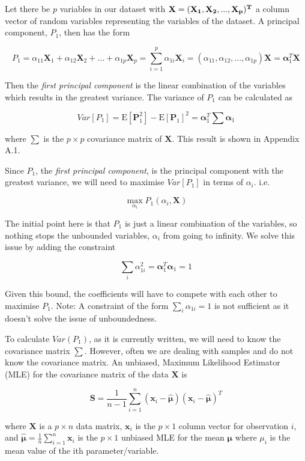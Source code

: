 \documentclass[11pt]{article}
\begin{document}
    Let there be \(p\) variables in our dataset with
\(\bf{X} = (\bf{X_1},\bf{X_2},...,\bf{X_p})^T\) a column vector of
random variables representing the variables of the dataset. A principal
component, \(P_1\), then has the form

\[P_1 = \alpha_{11} \textbf{X}_1 + \alpha_{12} \textbf{X}_2 + ... + \alpha_{1p} \textbf{X}_p = \sum_{i=1}^p \alpha_{1i} \textbf{X}_i = (\alpha_{11},\alpha_{12},...,\alpha_{1p})\textbf{X} = \boldsymbol{\alpha}_{1}^T \textbf{X}\]

Then the \emph{first principal component} is the linear combination of
the variables which results in the greatest variance. The variance of
\(P_1\) can be calculated as

\[Var[P_1] = \text{E}[\textbf{P}_1^2] - \text{E}[\textbf{P}_1]^2 = \boldsymbol{\alpha}_{1}^T \boldsymbol{\sum} \boldsymbol{\alpha}_{1}\]

where \(\boldsymbol{\sum}\) is the \(p \times p\) covariance matrix of
\(\textbf{X}\). This result is shown in Appendix A.1.

Since \(P_1\), the \emph{first principal component}, is the principal
component with the greatest variance, we will need to maximise
\(Var[P_1]\) in terms of \(\alpha_i\). i.e.

\[\max_{\alpha_i} P_1(\alpha_i,\boldsymbol{X})\]

The initial point here is that \(P_1\) is just a linear combination of
the variables, so nothing stops the unbounded variables, \(\alpha_i\)
from going to infinity. We solve this issue by adding the constraint

\[\sum_{i} \alpha_{1i}^2 = \boldsymbol{\alpha}_1^T \boldsymbol{\alpha}_1 =  1\]

Given this bound, the coefficients will have to compete with each other
to maximise \(P_1\). Note: A constraint of the form
\(\sum_{i} \alpha_{1i} = 1\) is not sufficient as it doesn't solve the
issue of unboundedness.

To calculate \(Var(P_1)\), as it is currently written, we will need to
know the covariance matrix \(\sum\). However, often we are dealing with
samples and do not know the covariance matrix. An unbiased, Maximum
Likelihood Estimator (MLE) for the covariance matrix of the data
\(\boldsymbol{X}\) is

\[\boldsymbol{S} = \frac{1}{n-1} \sum_{i=1}^n(\boldsymbol{x}_i - \hat{\boldsymbol{\mu}}) (\boldsymbol{x}_i - \hat{\boldsymbol{\mu}})^T\]

where \(\boldsymbol{X}\) is a \(p \times n\) data matrix,
\(\boldsymbol{x}_i\) is the \(p \times 1\) column vector for observation
\(i\), and
\(\hat{\boldsymbol{\mu}} = \frac{1}{n} \sum_{i=1}^n \boldsymbol{x}_i\)
is the \(p \times 1\) unbiased MLE for the mean \(\boldsymbol{\mu}\)
where \(\mu_i\) is the mean value of the ith parameter/variable.
\end{document}
